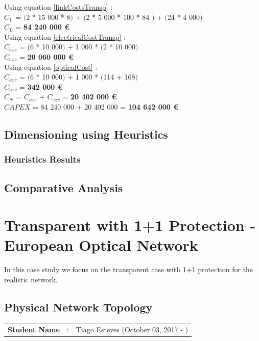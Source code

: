 Using equation \ref{linkCostsTransp} : \\
$C_L$ = $($2 * 15 000 * 8$)$ + $($2 * 5 000 * 100 * 84 $)$ + $($24 * 4 000$)$ \\
$C_L$ = \textbf{84 240 000 \euro} \\

Using equation \ref{electricalCostTransp} : \\
$C_{exc}$ = $($6 * 10 000$)$ + 1 000 * $($2 * 10 000$)$ \\
$C_{exc}$ = \textbf{20 060 000 \euro} \\

Using equation \ref{opticalCost} : \\
$C_{oxc}$ = $($6 * 10 000$)$ + 1 000 * $($114 + 168$)$ \\
$C_{oxc}$ = \textbf{342 000 \euro} \\
$C_N$ = $C_{oxc}$ + $C_{exc}$ = \textbf{20 402 000 \euro} \\

$CAPEX$ = 84 240 000 + 20 402 000 = \textbf{104 642 000 \euro}\\


\subsection{Dimensioning using Heuristics}

\subsubsection{Heuristics Results}

\subsection{Comparative Analysis}


\newpage
\section{Transparent with 1+1 Protection - European Optical Network}

In this case study we focus on the transparent case with 1+1 protection for the realistic network.

\subsection{Physical Network Topology}
\begin{tcolorbox}	
\begin{tabular}{p{2.75cm} p{0.2cm} p{10.5cm}} 	
\textbf{Student Name}  &:& Tiago Esteves    (October 03, 2017 - )\\
\end{tabular}
\end{tcolorbox}

